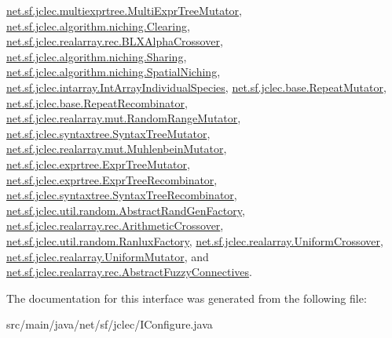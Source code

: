 \hyperlink{classnet_1_1sf_1_1jclec_1_1multiexprtree_1_1_multi_expr_tree_mutator_a75616ff8f7853621d29cb69a65a96e4a}{net.\-sf.\-jclec.\-multiexprtree.\-Multi\-Expr\-Tree\-Mutator}, \hyperlink{classnet_1_1sf_1_1jclec_1_1algorithm_1_1niching_1_1_clearing_a440e66f007b056d25542248a225492d2}{net.\-sf.\-jclec.\-algorithm.\-niching.\-Clearing}, \hyperlink{classnet_1_1sf_1_1jclec_1_1realarray_1_1rec_1_1_b_l_x_alpha_crossover_a19e22e8da08fe5dc86e6c256dc56fe18}{net.\-sf.\-jclec.\-realarray.\-rec.\-B\-L\-X\-Alpha\-Crossover}, \hyperlink{classnet_1_1sf_1_1jclec_1_1algorithm_1_1niching_1_1_sharing_ad181eb1b337015677811ccb6c0fee66e}{net.\-sf.\-jclec.\-algorithm.\-niching.\-Sharing}, \hyperlink{classnet_1_1sf_1_1jclec_1_1algorithm_1_1niching_1_1_spatial_niching_a70b75c7dd31e0d3eb64849cd3bd5de2a}{net.\-sf.\-jclec.\-algorithm.\-niching.\-Spatial\-Niching}, \hyperlink{classnet_1_1sf_1_1jclec_1_1intarray_1_1_int_array_individual_species_a9bcfbb7aba35202249e493f96a38bbf8}{net.\-sf.\-jclec.\-intarray.\-Int\-Array\-Individual\-Species}, \hyperlink{classnet_1_1sf_1_1jclec_1_1base_1_1_repeat_mutator_a7ab450ee589ea9a712e16e580cec514e}{net.\-sf.\-jclec.\-base.\-Repeat\-Mutator}, \hyperlink{classnet_1_1sf_1_1jclec_1_1base_1_1_repeat_recombinator_aff511cdd75cd7cf31e9a7bace3b37ca7}{net.\-sf.\-jclec.\-base.\-Repeat\-Recombinator}, \hyperlink{classnet_1_1sf_1_1jclec_1_1realarray_1_1mut_1_1_random_range_mutator_a5c4bb31a347fd336a6c7be4f56f9acc5}{net.\-sf.\-jclec.\-realarray.\-mut.\-Random\-Range\-Mutator}, \hyperlink{classnet_1_1sf_1_1jclec_1_1syntaxtree_1_1_syntax_tree_mutator_a1121fdb0ecbb9c448a18a8dea5f51566}{net.\-sf.\-jclec.\-syntaxtree.\-Syntax\-Tree\-Mutator}, \hyperlink{classnet_1_1sf_1_1jclec_1_1realarray_1_1mut_1_1_muhlenbein_mutator_a5409607c7d8f58933b90a0d946d92629}{net.\-sf.\-jclec.\-realarray.\-mut.\-Muhlenbein\-Mutator}, \hyperlink{classnet_1_1sf_1_1jclec_1_1exprtree_1_1_expr_tree_mutator_ae0c1d1db6bce702193c621c3b9366688}{net.\-sf.\-jclec.\-exprtree.\-Expr\-Tree\-Mutator}, \hyperlink{classnet_1_1sf_1_1jclec_1_1exprtree_1_1_expr_tree_recombinator_a665845477525ccf265a2e8bf147de695}{net.\-sf.\-jclec.\-exprtree.\-Expr\-Tree\-Recombinator}, \hyperlink{classnet_1_1sf_1_1jclec_1_1syntaxtree_1_1_syntax_tree_recombinator_ae22c9aaac84dedda6a2e510091bbe234}{net.\-sf.\-jclec.\-syntaxtree.\-Syntax\-Tree\-Recombinator}, \hyperlink{classnet_1_1sf_1_1jclec_1_1util_1_1random_1_1_abstract_rand_gen_factory_adbcc614c5ec7ae7d3a161286f2e5f741}{net.\-sf.\-jclec.\-util.\-random.\-Abstract\-Rand\-Gen\-Factory}, \hyperlink{classnet_1_1sf_1_1jclec_1_1realarray_1_1rec_1_1_arithmetic_crossover_a7f0403004c9f0c01a9ce54c544a38c5d}{net.\-sf.\-jclec.\-realarray.\-rec.\-Arithmetic\-Crossover}, \hyperlink{classnet_1_1sf_1_1jclec_1_1util_1_1random_1_1_ranlux_factory_afe444771948b703d1365d6e2b7c6dc40}{net.\-sf.\-jclec.\-util.\-random.\-Ranlux\-Factory}, \hyperlink{classnet_1_1sf_1_1jclec_1_1realarray_1_1_uniform_crossover_a8daa3f5542a370213ada13769c7abd28}{net.\-sf.\-jclec.\-realarray.\-Uniform\-Crossover}, \hyperlink{classnet_1_1sf_1_1jclec_1_1realarray_1_1_uniform_mutator_a2943ed155a1dc633aee8e6b4a2811ac6}{net.\-sf.\-jclec.\-realarray.\-Uniform\-Mutator}, and \hyperlink{classnet_1_1sf_1_1jclec_1_1realarray_1_1rec_1_1_abstract_fuzzy_connectives_a35538e69d56a5f2f01bdb8d485551165}{net.\-sf.\-jclec.\-realarray.\-rec.\-Abstract\-Fuzzy\-Connectives}.



The documentation for this interface was generated from the following file\-:\begin{DoxyCompactItemize}
\item 
src/main/java/net/sf/jclec/I\-Configure.\-java\end{DoxyCompactItemize}
